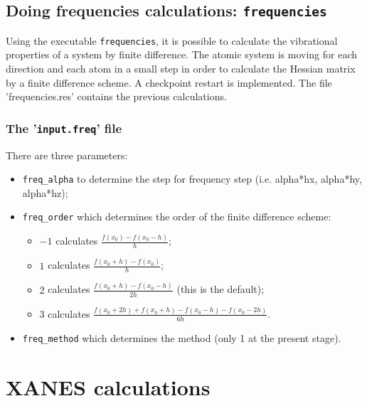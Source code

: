 \documentclass[a4paper,11pt]{report}
\begin{document}
\section{Doing frequencies calculations: \texttt{frequencies}}
Using the executable \texttt{frequencies}, it is possible to calculate the vibrational properties of
a system by finite difference. The atomic system is moving for each direction and each atom in a
small step in order to calculate the Hessian matrix by a finite difference scheme.
A checkpoint restart is implemented. The file 'frequencies.res' contains the previous calculations.

\subsection{The '\texttt{input.freq}' file}
There are three parameters:
\begin{itemize}
\item \texttt{freq\_alpha} to determine the step for frequency step (i.e. alpha*hx, alpha*hy, alpha*hz);
\item \texttt{freq\_order} which determines the order of the finite difference scheme:
      \begin{itemize}
      \item $-1$ calculates $\frac{f(x_0)-f(x_0-h)}{h}$;
      \item $1$ calculates $\frac{f(x_0+h)-f(x_0)}{h}$;
      \item $2$ calculates $\frac{f(x_0+h)-f(x_0-h)}{2h}$ (this is the default);
      \item $3$ calculates $\frac{f(x_0+2h)+f(x_0+h)-f(x_0-h)-f(x_0-2h)}{6h}$.
      \end{itemize}
\item \texttt{freq\_method} which determines the method (only 1 at the present stage).
\end{itemize}


\chapter{XANES calculations}
\end{document}
